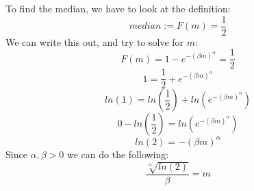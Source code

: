 To find the median, we have to look at the definition:
$$
median := F(m) = \frac{1}{2}
$$
We can write this out, and try to solve for $m$:
$$
F(m) = 1 - e^{-(\beta m)^{\alpha}} = \frac{1}{2}
$$
$$
1 = \frac{1}{2} + e^{-(\beta m)^{\alpha}}
$$
$$
ln(1) = ln\left(\frac{1}{2}\right) + ln(e^{-(\beta m)^\alpha})
$$
$$
0 - ln\left(\frac{1}{2}\right)= ln(e^{-(\beta m)^\alpha})
$$
$$
ln(2) = -(\beta m)^\alpha
$$
Since $\alpha, \beta > 0$ we can do the following:
$$
\frac{\sqrt[\alpha]{ln(2)}}{\beta} = m
$$